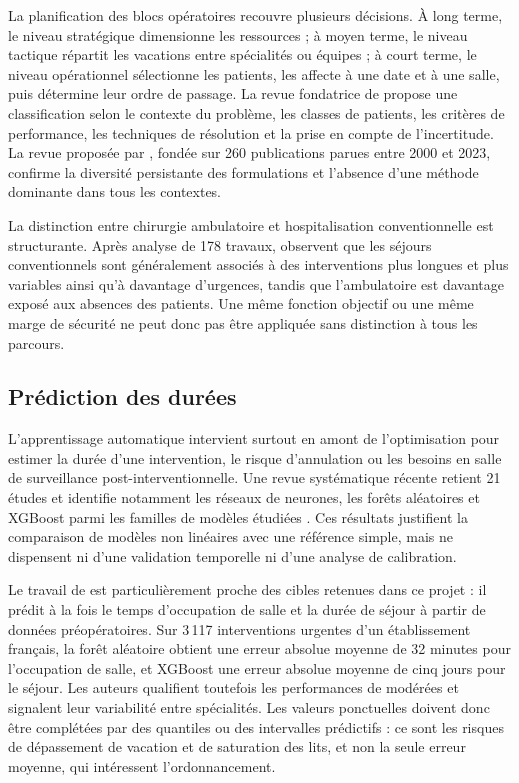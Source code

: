La planification des blocs opératoires recouvre plusieurs décisions. À long terme, le niveau stratégique dimensionne les ressources ; à moyen terme, le niveau tactique répartit les vacations entre spécialités ou équipes ; à court terme, le niveau opérationnel sélectionne les patients, les affecte à une date et à une salle, puis détermine leur ordre de passage. La revue fondatrice de \textcite{cardoen2010} propose une classification selon le contexte du problème, les classes de patients, les critères de performance, les techniques de résolution et la prise en compte de l'incertitude. La revue proposée par \textcite{alamin2025}, fondée sur 260 publications parues entre 2000 et 2023, confirme la diversité persistante des formulations et l'absence d'une méthode dominante dans tous les contextes.

La distinction entre chirurgie ambulatoire et hospitalisation conventionnelle est structurante. Après analyse de 178 travaux, \textcite{wang2021} observent que les séjours conventionnels sont généralement associés à des interventions plus longues et plus variables ainsi qu'à davantage d'urgences, tandis que l'ambulatoire est davantage exposé aux absences des patients. Une même fonction objectif ou une même marge de sécurité ne peut donc pas être appliquée sans distinction à tous les parcours.

\subsection{Prédiction des durées}

L'apprentissage automatique intervient surtout en amont de l'optimisation pour estimer la durée d'une intervention, le risque d'annulation ou les besoins en salle de surveillance post-interventionnelle. Une revue systématique récente retient 21 études et identifie notamment les réseaux de neurones, les forêts aléatoires et XGBoost parmi les familles de modèles étudiées \parencite{merghani2025}. Ces résultats justifient la comparaison de modèles non linéaires avec une référence simple, mais ne dispensent ni d'une validation temporelle ni d'une analyse de calibration.

Le travail de \textcite{dupre2025} est particulièrement proche des cibles retenues dans ce projet : il prédit à la fois le temps d'occupation de salle et la durée de séjour à partir de données préopératoires. Sur 3\,117 interventions urgentes d'un établissement français, la forêt aléatoire obtient une erreur absolue moyenne de 32 minutes pour l'occupation de salle, et XGBoost une erreur absolue moyenne de cinq jours pour le séjour. Les auteurs qualifient toutefois les performances de modérées et signalent leur variabilité entre spécialités. Les valeurs ponctuelles doivent donc être complétées par des quantiles ou des intervalles prédictifs : ce sont les risques de dépassement de vacation et de saturation des lits, et non la seule erreur moyenne, qui intéressent l'ordonnancement.

